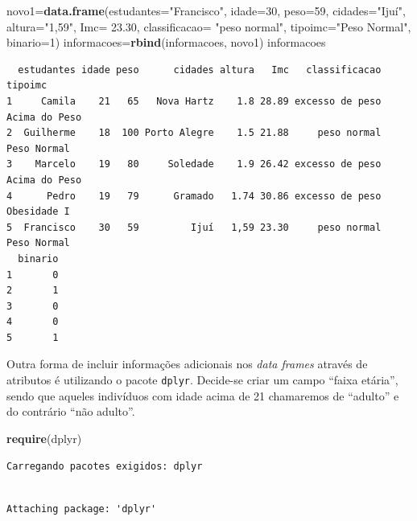 \documentclass[12pt,brazil,oneside]{book}
\newenvironment{Shaded}{\begin{snugshade}}{\end{snugshade}}
\newcommand{\DataTypeTok}[1]{\textcolor[rgb]{0.13,0.29,0.53}{#1}}
\newcommand{\DecValTok}[1]{\textcolor[rgb]{0.00,0.00,0.81}{#1}}
\newcommand{\FloatTok}[1]{\textcolor[rgb]{0.00,0.00,0.81}{#1}}
\newcommand{\KeywordTok}[1]{\textcolor[rgb]{0.13,0.29,0.53}{\textbf{#1}}}
\newcommand{\NormalTok}[1]{#1}
\newcommand{\StringTok}[1]{\textcolor[rgb]{0.31,0.60,0.02}{#1}}
\begin{document}
\begin{Shaded}
\begin{Highlighting}[]
\NormalTok{novo1=}\KeywordTok{data.frame}\NormalTok{(}\DataTypeTok{estudantes=}\StringTok{"Francisco"}\NormalTok{, }\DataTypeTok{idade=}\DecValTok{30}\NormalTok{, }\DataTypeTok{peso=}\DecValTok{59}\NormalTok{, }
                 \DataTypeTok{cidades=}\StringTok{"Ijuí"}\NormalTok{, }
                 \DataTypeTok{altura=}\StringTok{"1,59"}\NormalTok{, }
                 \DataTypeTok{Imc=} \FloatTok{23.30}\NormalTok{, }
                 \DataTypeTok{classificacao=} \StringTok{"peso normal"}\NormalTok{,}
                 \DataTypeTok{tipoimc=}\StringTok{"Peso Normal"}\NormalTok{, }
                 \DataTypeTok{binario=}\DecValTok{1}\NormalTok{)}
\NormalTok{informacoes=}\KeywordTok{rbind}\NormalTok{(informacoes, novo1)}
\NormalTok{informacoes}
\end{Highlighting}
\end{Shaded}

\begin{verbatim}
  estudantes idade peso      cidades altura   Imc   classificacao       tipoimc
1     Camila    21   65   Nova Hartz    1.8 28.89 excesso de peso Acima do Peso
2  Guilherme    18  100 Porto Alegre    1.5 21.88     peso normal   Peso Normal
3    Marcelo    19   80     Soledade    1.9 26.42 excesso de peso Acima do Peso
4      Pedro    19   79      Gramado   1.74 30.86 excesso de peso   Obesidade I
5  Francisco    30   59         Ijuí   1,59 23.30     peso normal   Peso Normal
  binario
1       0
2       1
3       0
4       0
5       1
\end{verbatim}

Outra forma de incluir informações adicionais nos \emph{data frames}
através de atributos é utilizando o pacote \texttt{dplyr}. Decide-se
criar um campo ``faixa etária'', sendo que aqueles indivíduos com idade
acima de 21 chamaremos de ``adulto'' e do contrário ``não adulto''.

\begin{Shaded}
\begin{Highlighting}[]
\KeywordTok{require}\NormalTok{(dplyr)}
\end{Highlighting}
\end{Shaded}

\begin{verbatim}
Carregando pacotes exigidos: dplyr
\end{verbatim}

\begin{verbatim}

Attaching package: 'dplyr'
\end{verbatim}
\end{document}

